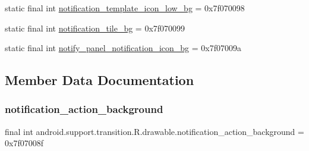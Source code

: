 \begin{DoxyCompactItemize}
\item 
static final int \mbox{\hyperlink{classandroid_1_1support_1_1transition_1_1R_1_1drawable_abdcffad9445d9236028d811f06e030f4}{notification\+\_\+template\+\_\+icon\+\_\+low\+\_\+bg}} = 0x7f070098
\item 
static final int \mbox{\hyperlink{classandroid_1_1support_1_1transition_1_1R_1_1drawable_ad920be4f2a571fceddc972f834706a4d}{notification\+\_\+tile\+\_\+bg}} = 0x7f070099
\item 
static final int \mbox{\hyperlink{classandroid_1_1support_1_1transition_1_1R_1_1drawable_a092035eb15baba9b662d4715dcf6e2f4}{notify\+\_\+panel\+\_\+notification\+\_\+icon\+\_\+bg}} = 0x7f07009a
\end{DoxyCompactItemize}


\subsection{Member Data Documentation}
\mbox{\label{classandroid_1_1support_1_1transition_1_1R_1_1drawable_aa63a282bba48259acff502a4c32c48dd}} 
\subsubsection{\texorpdfstring{notification\+\_\+action\+\_\+background}{notification\_action\_background}}
{\footnotesize\ttfamily final int android.\+support.\+transition.\+R.\+drawable.\+notification\+\_\+action\+\_\+background = 0x7f07008f\hspace{0.3cm}{\ttfamily [static]}}

\mbox{\label{classandroid_1_1support_1_1transition_1_1R_1_1drawable_a4e2d76cf7e408949c2b4a0776c7d683e}} 
